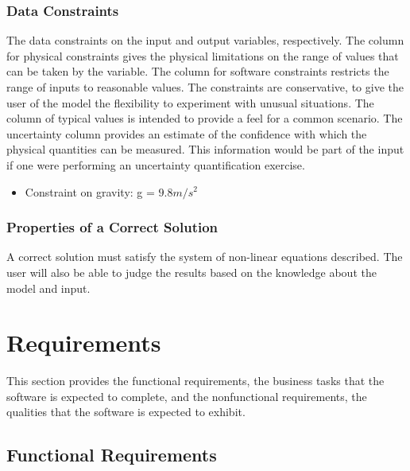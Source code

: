 \documentclass[12pt]{article}
\begin{document}
\subsubsection{Data Constraints} \label{sec_DataConstraints}    

The data constraints on the input and output variables, respectively.  
The column for physical constraints gives the physical limitations on 
the range of values that can be taken by the
variable.  The column for software constraints restricts the range of inputs to
reasonable values.  The constraints are conservative, to give the user of the
model the flexibility to experiment with unusual situations.  The column of
typical values is intended to provide a feel for a common scenario.  The
uncertainty column provides an estimate of the confidence with which the
physical quantities can be measured.  This information would be part of the
input if one were performing an uncertainty quantification exercise.

\begin{itemize}
\item Constraint on gravity: g = $9.8 m/s^2$
\end{itemize}

\subsubsection{Properties of a Correct Solution}

\noindent
A correct solution must satisfy the system of non-linear equations described. 
The user will also be able to judge the results based on the knowledge about the model and input.

\newpage
\section{Requirements}

This section provides the functional requirements, the business tasks that the
software is expected to complete, and the nonfunctional requirements, the
qualities that the software is expected to exhibit.


\subsection{Functional Requirements}
\end{document}
